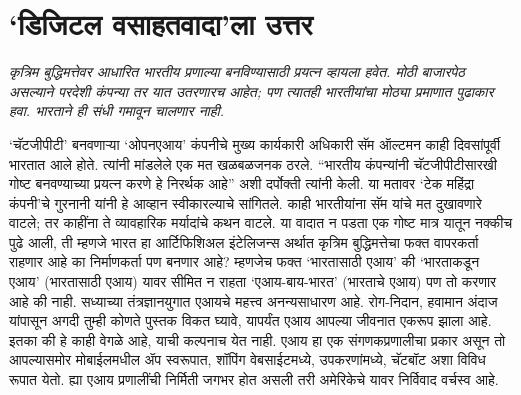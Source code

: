 \chapter{`डिजिटल वसाहतवादा'ला उत्तर }

{\textit{कृत्रिम बुद्धिमत्तेवर आधारित भारतीय प्रणाल्या बनविण्यासाठी प्रयत्न व्हायला हवेत. मोठी बाजारपेठ असल्याने परदेशी कंपन्या तर यात उतरणारच आहेत; पण त्यातही भारतीयांचा मोठ्या प्रमाणात पुढाकार हवा. भारताने ही संधी गमावून चालणार नाही.}}

\vspace{1.5em}

`चॅटजीपीटी' बनवणाऱ्या `ओपनएआय' कंपनीचे मुख्य कार्यकारी अधिकारी सॅम ऑल्टमन काही दिवसांपूर्वी भारतात आले होते. त्यांनी मांडलेले एक मत खळबळजनक ठरले. ``भारतीय कंपन्यांनी चॅटजीपीटीसारखी गोष्ट बनवण्याच्या प्रयत्न करणे हे निरर्थक आहे'' अशी दर्पोक्ती त्यांनी केली. या मतावर `टेक महिंद्रा कंपनी'चे गुरनानी यांनी हे आव्हान स्वीकारल्याचे सांगितले. काही भारतीयांना सॅम यांचे मत दुखावणारे वाटले; तर काहींना ते व्यावहारिक मर्यादांचे कथन वाटले. या वादात न पडता एक गोष्ट मात्र यातून नक्कीच पुढे आली, ती म्हणजे भारत हा आर्टिफिशिअल इंटेलिजन्स अर्थात कृत्रिम बुद्धिमत्तेचा फक्त वापरकर्ता राहणार आहे का निर्माणकर्ता पण बनणार आहे?  म्हणजेच फक्त `भारतासाठी एआय' की `भारताकडून एआय' (भारतासाठी एआय) यावर सीमित न राहता `एआय-बाय-भारत' (भारताचे एआय) पण तो करणार आहे की नाही.  सध्याच्या तंत्रज्ञानयुगात एआयचे महत्त्व अनन्यसाधारण आहे. रोग-निदान, हवामान अंदाज यांपासून अगदी तुम्ही कोणते पुस्तक विकत घ्यावे, यापर्यंत एआय आपल्या जीवनात एकरूप झाला आहे. इतका की हे काही वेगळे आहे, याची कल्पनाच येत नाही. एआय हा एक संगणकप्रणालीचा प्रकार असून तो आपल्यासमोर मोबाईलमधील ॲप स्वरूपात, शॉपिंग वेबसाईटमध्ये, उपकरणांमध्ये, चॅटबॉट अशा विविध रूपात येतो. ह्या एआय प्रणालींची निर्मिती जगभर होत असली तरी अमेरिकेचे यावर निर्विवाद वर्चस्व आहे. 

